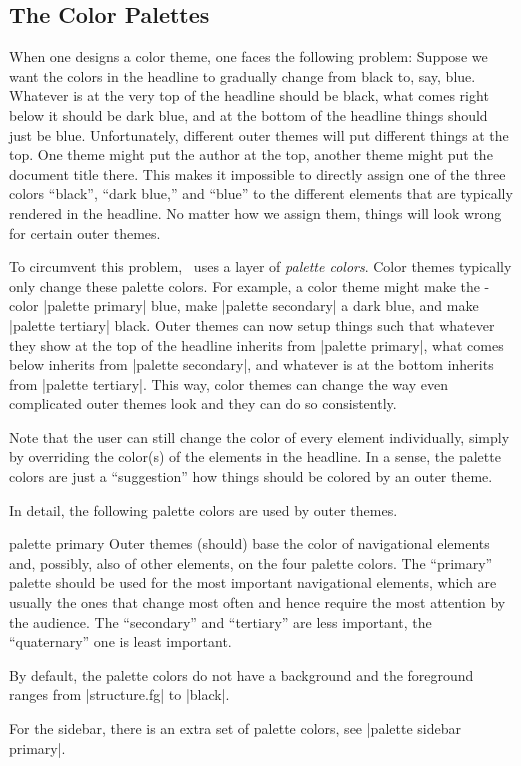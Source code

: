 \subsection{The Color Palettes}

When one designs a color theme, one faces the following problem: Suppose we want the colors in the headline to gradually change from black to, say, blue. Whatever is at the very top of the headline should be black, what comes right below it should be dark blue, and at the bottom of the headline things should just be blue. Unfortunately, different outer themes will put different things at the top. One theme might put the author at the top, another theme might put the document title there. This makes it impossible to directly assign one of the three colors ``black'', ``dark blue,'' and ``blue'' to the different elements that are typically rendered in the headline. No matter how we assign them, things will look wrong for certain outer themes.

To circumvent this problem, \beamer\ uses a layer of \emph{palette colors}. Color themes typically only change these palette colors. For example, a color theme might make the \beamer-color |palette primary| blue, make |palette secondary| a dark blue, and make |palette tertiary| black. Outer themes can now setup things such that whatever they show at the top of the headline inherits from |palette primary|, what comes below inherits from |palette secondary|, and whatever is at the bottom inherits from |palette tertiary|. This way, color themes can change the way even complicated outer themes look and they can do so consistently.

Note that the user can still change the color of every element individually, simply by overriding the color(s) of the elements in the headline. In a sense, the palette colors are just a ``suggestion'' how things should be colored by an outer theme.

In detail, the following palette colors are used by outer themes.

\begin{element}{palette primary}\no\yes\no
  Outer themes (should) base the color of navigational elements and, possibly, also of other elements, on the four palette colors. The ``primary'' palette should be used for the most important navigational elements, which are usually the ones that change most often and hence require the most attention by the audience. The ``secondary'' and ``tertiary'' are less important, the ``quaternary'' one is least important.

  By default, the palette colors do not have a background and the foreground ranges from |structure.fg| to |black|.

  For the sidebar, there is an extra set of palette colors, see |palette sidebar primary|.
\end{element}

